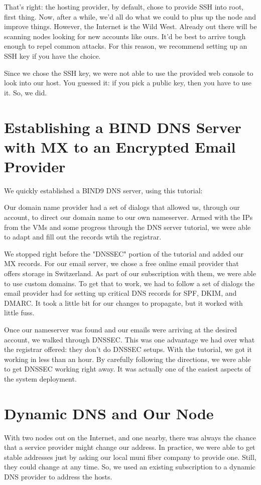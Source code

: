 That's right:  the hosting provider, by default, chose to provide SSH into root, first thing.  Now, after a while, we'd all do what we could to plus up the node and improve things.  However, the Internet is the Wild West.  Already out there will be scanning nodes looking for new accounts like ours.  It'd be best to arrive tough enough to repel common attacks.  For this reason, we recommend setting up an SSH key if you have the choice.

Since we chose the SSH key, we were not able to use the provided web console to look into our host.  You guessed it:  if you pick a public key, then you have to use it.  So, we did.  

\section{Establishing a BIND DNS Server with MX to an Encrypted Email Provider}


We quickly established a BIND9 DNS server, using this tutorial: \endnote{[1]}

Our domain name provider had a set of dialogs that allowed us, through our account, to direct our domain name to our own nameserver.  Armed with the IPs from the VMs and some progress through the DNS server tutorial, we were able to adapt and fill out the records wtih the registrar.

We stopped right before the "DNSSEC" portion of the tutorial and added our MX records.  For our email server, we chose a free online email provider that offers storage in Switzerland.  As part of our subscription with them, we were able to use custom domains.  To get that to work, we had to follow a set of dialogs the email provider had for setting up critical DNS records for SPF, DKIM, and DMARC.  It took a little bit for our changes to propagate, but it worked with little fuss.


Once our nameserver was found and our emails were arriving at the desired account, we walked through DNSSEC.  This was one advantage we had over what the registrar offered:  they don't do DNSSEC setups.  With the tutorial, we got it working in less than an hour.  By carefully following the directions, we were able to get DNSSEC working right away.  It was actually one of the easiest aspects of the system deployment.

\section{Dynamic DNS and Our Node}
With two nodes out on the Internet, and one nearby, there was always the chance that a service provider might change our address.  In practice, we were able to get stable addresses just by asking our local muni fiber company to provide one.  Still, they could change at any time.  So, we used an existing subscription to a dynamic DNS provider to address the hosts.  

